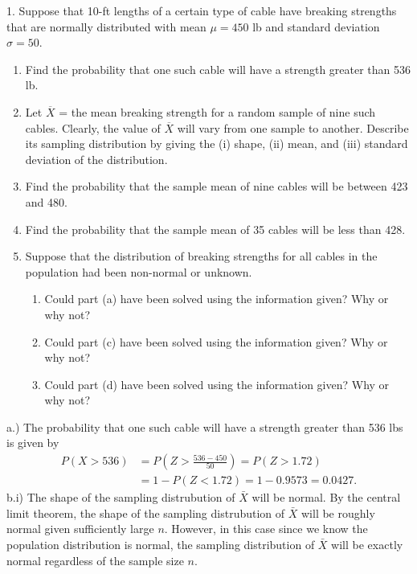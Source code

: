 \documentclass{report}
\begin{document}
\begin{mdframed}
    1. Suppose that 10-ft lengths of a certain type of cable have breaking strengths that are normally distributed with mean \(\mu = 450\) lb and standard deviation \(\sigma = 50\).
    \begin{enumerate}[label=(\alph*)]
        \item Find the probability that one such cable will have a strength greater than 536 lb.
        \item Let \(\overline{X}\) = the mean breaking strength for a random sample of nine such cables. Clearly, the value of \(\overline{X}\) will vary from one sample to another. Describe its sampling distribution by giving the (i) shape, (ii) mean, and (iii) standard deviation of the distribution.
        \item Find the probability that the sample mean of nine cables will be between 423 and 480.
        \item Find the probability that the sample mean of 35 cables will be less than 428.
        \item Suppose that the distribution of breaking strengths for all cables in the population had been non-normal or unknown.
            \begin{enumerate}[label=(\roman*)]
            \item Could part (a) have been solved using the information given? Why or why not?
            \item Could part (c) have been solved using the information given? Why or why not?
            \item Could part (d) have been solved using the information given? Why or why not?
        \end{enumerate}
    \end{enumerate}
\end{mdframed}
\bigbreak \noindent 
a.)  The probability that one such cable will have a strength greater than 536 lbs is given by
\begin{align*}
    P(X > 536) &= P\left(Z > \frac{536 - 450}{50}\right) = P(Z > 1.72) \\
    &=1-P(Z < 1.72) = 1- 0.9573 = 0.0427
.\end{align*}
\bigbreak \noindent 
b.i) The shape of the sampling distrubution of $\bar{X}$ will be normal. By the central limit theorem, the shape of the sampling distrubution of $\bar{X}$ will be roughly normal given sufficiently large $n$. However, in this case since we know the population distribution is normal, the sampling distribution of $\bar{X}$ will be exactly normal regardless of the sample size $n$.
\end{document}
